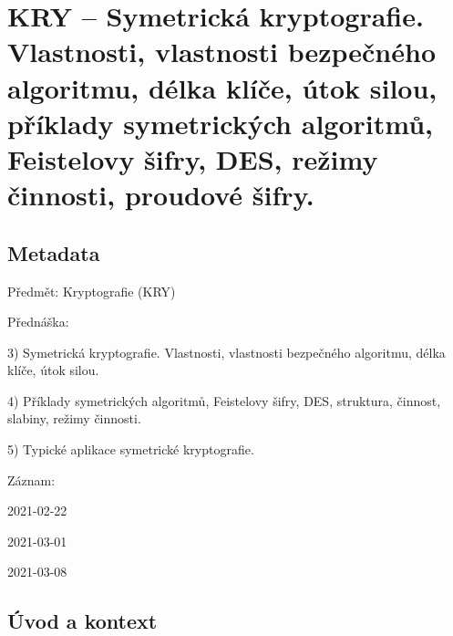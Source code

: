

\graphicspath{{kry/symetricka_kryptografie}}


\chapter{KRY -- Symetrická kryptografie. Vlastnosti, vlastnosti bezpečného algoritmu, délka klíče, útok silou, příklady symetrických algoritmů, Feistelovy šifry, DES, režimy činnosti, proudové šifry.}


\section{Metadata}

\begin{compactitem}
    \item Předmět: Kryptografie (KRY)
    \item Přednáška:
    \begin{compactitem}
        \item 3) Symetrická kryptografie. Vlastnosti, vlastnosti bezpečného algoritmu, délka klíče, útok silou.
        \item 4) Příklady symetrických algoritmů, Feistelovy šifry, DES, struktura, činnost, slabiny, režimy činnosti.
        \item 5) Typické aplikace symetrické kryptografie.
    \end{compactitem}
    \item Záznam:
    \begin{compactitem}
        \item 2021-02-22
        \item 2021-03-01
        \item 2021-03-08
    \end{compactitem}
\end{compactitem}


\section{Úvod a kontext}

